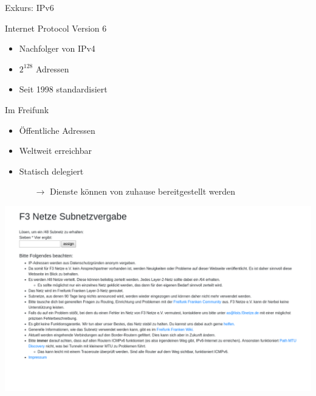\documentclass{beamer}
\begin{document}
	\begin{frame}{Exkurs: IPv6}
		\begin{block}{Internet Protocol Version 6}
		\begin{itemize}
			\item Nachfolger von IPv4
			\item $2^{128}$ Adressen
			\item Seit 1998 standardisiert
		\end{itemize}
		\end{block}
		\pause
		\begin{block}{Im Freifunk}
		\begin{itemize}
			\item Öffentliche Adressen
			\item Weltweit erreichbar
			\item Statisch delegiert
			\begin{itemize}
			 \item[$\rightarrow$] Dienste können von zuhause bereitgestellt werden
			\end{itemize}
		\end{itemize}
		\end{block}
	\end{frame}

	\begin{frame}
		\includegraphics[width=\framewidth]{media/f3nsub.png}
	\end{frame}
\end{document}
